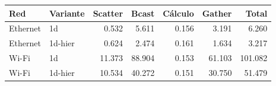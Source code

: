 \begin{center}\small
\begin{tabular}{llrrrrr}
\toprule
Red & Variante & Scatter & Bcast & Cálculo & Gather & Total \\
\midrule
Ethernet & 1d & 0.532 & 5.611 & 0.156 & 3.191 & 6.260 \\
Ethernet & 1d-hier & 0.624 & 2.474 & 0.161 & 1.634 & 3.217 \\
Wi-Fi & 1d & 11.373 & 88.904 & 0.153 & 61.103 & 101.082 \\
Wi-Fi & 1d-hier & 10.534 & 40.272 & 0.151 & 30.750 & 51.479 \\
\bottomrule
\end{tabular}
\end{center}
